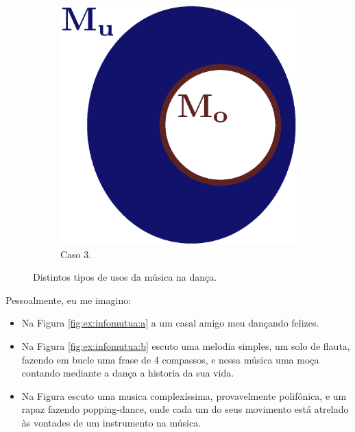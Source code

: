 \begin{figure}[ht]
\begin{subfigure}{.28\textwidth}
  \centering
  \includegraphics[width=.9\linewidth]{chapters/cap-musicalidade/musicalidade-it3.eps}  
  \caption{Caso 3.}
  \label{fig:ex:infomutua:c}
\end{subfigure}
\caption{Distintos tipos de usos da música na dança.}
\label{fig:ex:infomutua}
\end{figure}

Pessoalmente, eu me imagino:
\begin{itemize}
\item Na Figura \ref{fig:ex:infomutua:a} a um casal amigo meu dançando felizes.
\item Na Figura \ref{fig:ex:infomutua:b} escuto uma melodia simples, um solo de flauta,
fazendo em bucle uma frase de 4 compassos, 
e nessa música uma moça contando mediante a dança a historia da sua vida.
\item Na Figura \label{fig:ex:infomutua:c} escuto uma musica complexíssima, 
provavelmente polifônica, e um rapaz fazendo popping-dance,
onde cada um do seus movimento está atrelado às vontades de um instrumento na música.
\end{itemize}



